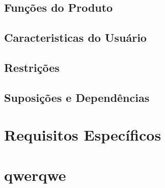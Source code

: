 \documentclass[a4paper,10pt]{book}
\begin{document}
\section{Funções do Produto}

\section{Caracteristicas do Usuário}
\section{Restrições}
\section{Suposições e Dependências}

\chapter{Requisitos Específicos}


\appendix
\chapter{qwerqwe}

\printindex
\end{document}
